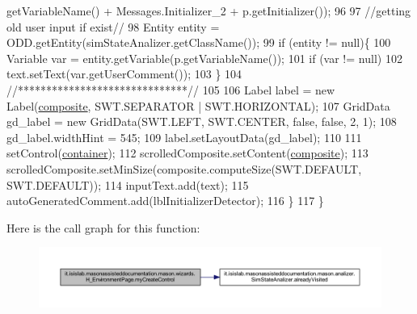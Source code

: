 \begin{DoxyCode}
      getVariableName() + Messages.Initializer\_2 + p.getInitializer());
96             
97             \textcolor{comment}{//getting old user input if exist//}
98             Entity entity = ODD.getEntity(simStateAnalizer.getClassName());
99             \textcolor{keywordflow}{if} (entity != null)\{
100                 Variable var = entity.getVariable(p.getVariableName());
101                 \textcolor{keywordflow}{if} (var != null)
102                     text.setText(var.getUserComment());
103             \}
104             \textcolor{comment}{//******************************//}
105             
106             Label label = \textcolor{keyword}{new} Label(\hyperlink{classit_1_1isislab_1_1masonassisteddocumentation_1_1mason_1_1wizards_1_1_h___environment_page_a08701d3343b8c6232831af0077e6cb37}{composite}, SWT.SEPARATOR | SWT.HORIZONTAL);
107             GridData gd\_label = \textcolor{keyword}{new} GridData(SWT.LEFT, SWT.CENTER, \textcolor{keyword}{false}, \textcolor{keyword}{false}, 2, 1);
108             gd\_label.widthHint = 545;
109             label.setLayoutData(gd\_label);
110             
111             setControl(\hyperlink{classit_1_1isislab_1_1masonassisteddocumentation_1_1mason_1_1wizards_1_1_h___environment_page_a77ebe828c5c45ce8b60db94f30d94203}{container});
112             scrolledComposite.setContent(\hyperlink{classit_1_1isislab_1_1masonassisteddocumentation_1_1mason_1_1wizards_1_1_h___environment_page_a08701d3343b8c6232831af0077e6cb37}{composite});
113             scrolledComposite.setMinSize(composite.computeSize(SWT.DEFAULT, SWT.DEFAULT));  
114             inputText.add(text);
115             autoGeneratedComment.add(lblInitializerDetector);
116         \}
117     \}
\end{DoxyCode}


Here is the call graph for this function\-:
\nopagebreak
\begin{figure}[H]
\begin{center}
\leavevmode
\includegraphics[width=350pt]{classit_1_1isislab_1_1masonassisteddocumentation_1_1mason_1_1wizards_1_1_h___environment_page_a99746d862f89a4dad13af734914642cf_cgraph}
\end{center}
\end{figure}





